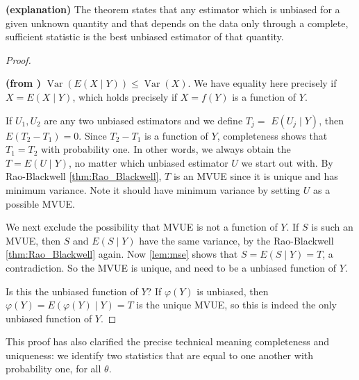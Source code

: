 \documentclass{article}
\newcommand{\bfs}[1]{\textbf{({#1}) }}
\begin{document}
\begin{rema}\bfs{explanation}
The theorem states that any estimator which is unbiased for a given unknown quantity and that depends on the data only through a complete, sufficient statistic is the  best unbiased estimator of that quantity.
\end{rema}
\begin{proof}
\begin{lema}\bfs{from \cite[Chapter 3.]{mitnotes}}\label{lem:mse}
$\operatorname{Var}(E(X \mid Y)) \leq \operatorname{Var}(X)$. We have equality here precisely if $X=E(X \mid Y)$, which holds precisely if $X=f(Y)$ is a function of $Y$.
\end{lema}

If $U_{1}, U_{2}$ are any two unbiased estimators and we define $T_{j}=$ $E\left(U_{j} \mid Y\right)$, then $E\left(T_{2}-T_{1}\right)=0$. Since $T_{2}-T_{1}$ is a function of $Y$, completeness shows that $T_{1}=T_{2}$ with probability one. In other words, we always obtain the  $T=E(U \mid Y)$, no matter which unbiased estimator $U$ we start out with. By Rao-Blackwell \cref{thm:Rao_Blackwell}, $T$ is an MVUE since it is unique and has minimum variance. Note it should have minimum variance by setting $U$ as a possible MVUE. 

We next exclude the possibility that MVUE is not a function of $Y$. If $S$ is such an MVUE, then $S$ and $E(S \mid Y)$ have the same variance, by the Rao-Blackwell \cref{thm:Rao_Blackwell} again. Now \cref{lem:mse} shows that $S=E(S \mid Y)=T$, a contradiction. So the MVUE is unique, and need to be a unbiased function of $Y$. 

Is this the  unbiased function of $Y$? If $\varphi(Y)$ is unbiased, then $\varphi(Y)=E(\varphi(Y) \mid Y)=T$ is the unique MVUE, so this is indeed the only unbiased function of $Y$.
\end{proof}
\begin{rema}
This proof has also clarified the precise technical meaning completeness and uniqueness: we identify two statistics that are equal to one another with probability one, for all $\theta$.
\end{rema}
\end{document}
